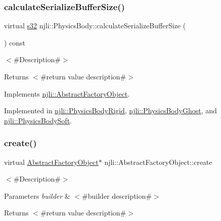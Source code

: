 \subsubsection{\texorpdfstring{calculate\+Serialize\+Buffer\+Size()}{calculateSerializeBufferSize()}}
{\footnotesize\ttfamily virtual \mbox{\hyperlink{_util_8h_aa62c75d314a0d1f37f79c4b73b2292e2}{s32}} njli\+::\+Physics\+Body\+::calculate\+Serialize\+Buffer\+Size (\begin{DoxyParamCaption}{ }\end{DoxyParamCaption}) const\hspace{0.3cm}{\ttfamily [pure virtual]}}

$<$\#\+Description\#$>$

\begin{DoxyReturn}{Returns}
$<$\#return value description\#$>$ 
\end{DoxyReturn}


Implements \mbox{\hyperlink{classnjli_1_1_abstract_factory_object_a4763d05bc9dc37c559111f8bb30e1dd8}{njli\+::\+Abstract\+Factory\+Object}}.



Implemented in \mbox{\hyperlink{classnjli_1_1_physics_body_rigid_a8263223fca42a563b9f2a756d077c8b1}{njli\+::\+Physics\+Body\+Rigid}}, \mbox{\hyperlink{classnjli_1_1_physics_body_ghost_aba5336f0f355644716a17ccc03b83535}{njli\+::\+Physics\+Body\+Ghost}}, and \mbox{\hyperlink{classnjli_1_1_physics_body_soft_ae2588284d8f625c70e93ed293bb9cb0b}{njli\+::\+Physics\+Body\+Soft}}.

\mbox{\label{classnjli_1_1_physics_body_a83a8876ae63b92804004cf3febe76573}} 
\subsubsection{\texorpdfstring{create()}{create()}\hspace{0.1cm}{\footnotesize\ttfamily [1/2]}}
{\footnotesize\ttfamily virtual \mbox{\hyperlink{classnjli_1_1_abstract_factory_object}{Abstract\+Factory\+Object}}$\ast$ njli\+::\+Abstract\+Factory\+Object\+::create}

$<$\#\+Description\#$>$


\begin{DoxyParams}{Parameters}
{\em builder} & $<$\#builder description\#$>$\\
\hline
\end{DoxyParams}
\begin{DoxyReturn}{Returns}
$<$\#return value description\#$>$ 
\end{DoxyReturn}
\mbox{\label{classnjli_1_1_physics_body_a440e12dbc2367ac3676481183bc8869c}} 
